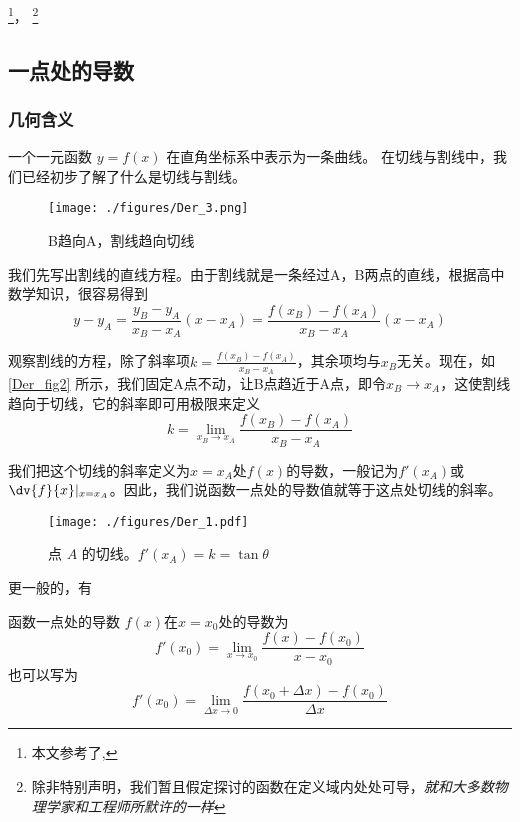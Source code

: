
\footnote{本文参考了\cite{同济高},\cite{Thomas}}，
\footnote{除非特别声明，我们暂且假定探讨的函数在定义域内处处可导，\textsl{就和大多数物理学家和工程师所默许的一样}}
\subsection{一点处的导数}
\subsubsection{几何含义}
一个一元函数 $y = f(x)$ 在直角坐标系中表示为一条曲线。 在切线与割线中，我们已经初步了解了什么是切线与割线。

\begin{figure}[ht]
\centering
\texttt{[image: ./figures/Der\_3.png]}
\caption{B趋向A，割线趋向切线} \label{Der_fig2}
\end{figure}

我们先写出割线的直线方程。由于割线就是一条经过A，B两点的直线，根据高中数学知识，很容易得到
\begin{equation}
y-y_A=\frac{y_B-y_A}{x_B-x_A}(x-x_A)=\frac{f(x_B)-f(x_A)}{x_B-x_A}(x-x_A)
\end{equation}

观察割线的方程，除了斜率项$k=\frac{f(x_B)-f(x_A)}{x_B-x_A}$，其余项均与$x_B$无关。现在，如\autoref{Der_fig2} 所示，我们固定A点不动，让B点趋近于A点，即令$x_B\rightarrow x_A$，这使割线趋向于切线，它的斜率即可用极限来定义
\begin{equation}
k=\lim_{x_B\to x_A}\frac{f(x_B)-f(x_A)}{x_B-x_A}
\end{equation}

我们把这个切线的斜率定义为$x=x_A$处$f(x)$的导数，一般记为$f'(x_A)$或$\dv{f}{x}|_{x=x_A}$。因此，我们说函数一点处的导数值就等于这点处切线的斜率。

\begin{figure}[ht]
\centering
\texttt{[image: ./figures/Der\_1.pdf]}
\caption{点 $A$ 的切线。$f'(x_A)=k=\tan \theta$}
\end{figure}

更一般的，有
\begin{definition}{函数一点处的导数}
$f(x)$在$x=x_0$处的导数为
\begin{equation}
f'(x_0)=\lim_{x\to x_0}\frac{f(x)-f(x_0)}{x-x_0}
\end{equation}
也可以写为
\begin{equation}\label{Der_eq2}
f'(x_0)=\lim_{\Delta x\to0}\frac{f(x_0+\Delta x)-f(x_0)}{\Delta x}
\end{equation}
\end{definition}

